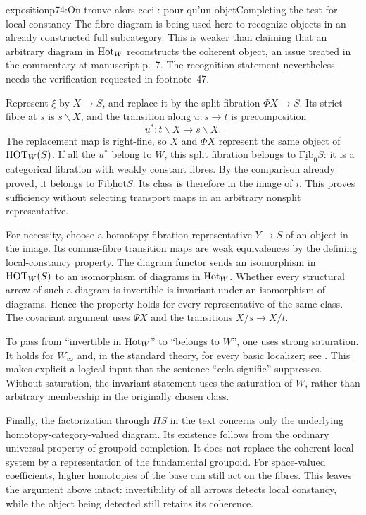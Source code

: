 \begin{dcomment}{exposition}{p74:On trouve alors ceci : pour qu'un objet}{Completing the test for local constancy}
The fibre diagram is being used here to recognize objects in an already constructed full subcategory. This is weaker than claiming that an arbitrary diagram in $\mathrm{Hot}_W$ reconstructs the coherent object, an issue treated in the commentary at manuscript p.~7. The recognition statement nevertheless needs the verification requested in footnote~47.

Represent $\xi$ by $X\to S$, and replace it by the split fibration $\Phi X\to S$. Its strict fibre at $s$ is $s\backslash X$, and the transition along $u:s\to t$ is precomposition
\[
 u^*:t\backslash X\longrightarrow s\backslash X.
\]
The replacement map is right-fine, so $X$ and $\Phi X$ represent the same object of $\mathrm{HOT}_W(S)$. If all the $u^*$ belong to $W$, this split fibration belongs to $\underline{\mathrm{Fib}}_0S$: it is a categorical fibration with weakly constant fibres. By the comparison already proved, it belongs to $\underline{\mathrm{Fibhot}}S$. Its class is therefore in the image of $i$. This proves sufficiency without selecting transport maps in an arbitrary nonsplit representative.

For necessity, choose a homotopy-fibration representative $Y\to S$ of an object in the image. Its comma-fibre transition maps are weak equivalences by the defining local-constancy property. The diagram functor sends an isomorphism in $\mathrm{HOT}_W(S)$ to an isomorphism of diagrams in $\mathrm{Hot}_W$. Whether every structural arrow of such a diagram is invertible is invariant under an isomorphism of diagrams. Hence the property holds for every representative of the same class. The covariant argument uses $\Psi X$ and the transitions $X/s\to X/t$.

To pass from ``invertible in $\mathrm{Hot}_W$'' to ``belongs to $W$'', one uses strong saturation. It holds for $W_\infty$ and, in the standard theory, for every basic localizer; see \citet[Proposition~4.2.4]{Cisinski2006Presheaves}. This makes explicit a logical input that the sentence ``cela signifie'' suppresses. Without saturation, the invariant statement uses the saturation of $W$, rather than arbitrary membership in the originally chosen class.

Finally, the factorization through $\Pi S$ in the text concerns only the underlying homotopy-category-valued diagram. Its existence follows from the ordinary universal property of groupoid completion. It does not replace the coherent local system by a representation of the fundamental groupoid. For space-valued coefficients, higher homotopies of the base can still act on the fibres. This leaves the argument above intact: invertibility of all arrows detects local constancy, while the object being detected still retains its coherence.
\end{dcomment}


